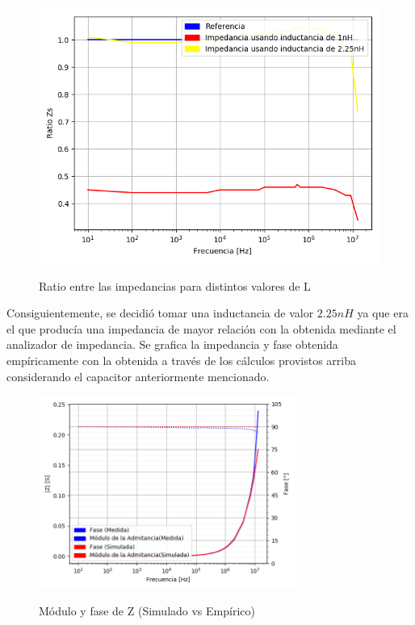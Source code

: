 \begin{figure}[H]
\centering
\includegraphics[width=1\textwidth]{Ejercicio_1(Germo)/Grafico/capacitor_relacion_entre_Z.png}
\label{fig:capacitor_relacion_entre_Z}
\caption{Ratio entre las impedancias para distintos valores de L}
\end{figure}


Consiguientemente, se decidió tomar una inductancia de valor $2.25nH$ ya que era el que producía una impedancia de mayor relación con la obtenida mediante el analizador de impedancia. Se grafica la impedancia y fase obtenida empíricamente con la obtenida a través de los cálculos provistos arriba considerando el capacitor anteriormente mencionado.

\begin{figure}[H]
\centering
\includegraphics[width=0.75\textwidth]{Ejercicio_1(Germo)/Grafico/Capacitor_relacion_entre_Z_y_fases.png}
\label{fig:Capacitor_relacion_entre_Z_y_fases}
\caption{Módulo y fase de Z (Simulado vs Empírico)}
\end{figure}

